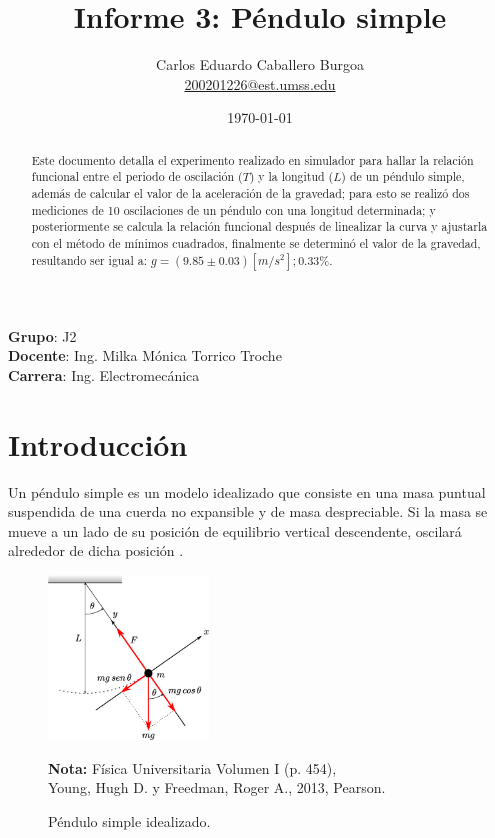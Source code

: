 \documentclass[letter,11pt]{article}
\title{Informe 3: Péndulo simple}
\author{Carlos Eduardo Caballero Burgoa \\
    \small{\href{mailto:200201226@est.umss.edu}{200201226@est.umss.edu}}
}
\date{\today}
\newcommand{\source}[1]{\vspace{-11pt} \caption*{\small{\textbf{Nota:} {#1}}}}
\begin{document}
\maketitle
\begin{center}
    \textbf{Grupo}: J2\\
    \textbf{Docente}: Ing. Milka Mónica Torrico Troche\\
    \textbf{Carrera}: Ing. Electromecánica
\end{center}

\begin{abstract}
Este documento detalla el experimento realizado en simulador para hallar la
relación funcional entre el periodo de oscilación ($T$) y la longitud ($L$) de
un péndulo simple, además de calcular el valor de la aceleración de la gravedad;
para esto se realizó dos mediciones de 10 oscilaciones de un péndulo con una
longitud determinada; y posteriormente se calcula la relación funcional después
de linealizar la curva y ajustarla con el método de mínimos cuadrados,
finalmente se determinó el valor de la gravedad, resultando ser igual a:
$g = (9.85 \pm 0.03)[m/s^2]; 0.33\%$.
\end{abstract}

\section{Introducción}

Un péndulo simple es un modelo idealizado que consiste en una masa puntual
suspendida de una cuerda no expansible y de masa despreciable. Si la masa se
mueve a un lado de su posición de equilibrio vertical descendente, oscilará
alrededor de dicha posición \cite{Young&Freedman}.

\begin{figure}
\centering
\includegraphics[width=0.38\textwidth]{resources/f1.eps}
\caption{Péndulo simple idealizado.}
\label{figura1}
\source{Física Universitaria Volumen I (p. 454), \\
Young, Hugh D. y Freedman, Roger A., 2013, Pearson.}
\end{figure}
\end{document}
